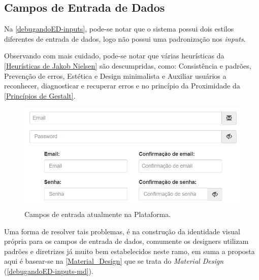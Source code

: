 \subsection{Campos de Entrada de Dados}
\label{Campos_de_Entrada_de_Dados}

Na \autoref{debugandoED-inputs}, pode-se notar que o sistema possui dois estilos diferentes de entrada de dados, logo não possui uma padronização nos \textit{inputs}.

Observando com mais cuidado, pode-se notar que várias heurísticas da \autoref{Heurísticas de Jakob Nielsen} são descumpridas, como: Consistência e padrões, Prevenção de erros, Estética e Design minimalista e Auxiliar usuários a reconhecer, diagnosticar e recuperar erros e no princípio da Proximidade da \autoref{Princípios de Gestalt}.


\begin{figure}[ht]
    \begin{center}
	    \includegraphics[scale=0.55]{figs/debugandoED-inputs.png}
	\end{center}
    \caption{\label{debugandoED-inputs}Campos de entrada atualmente na Plataforma.}
\end{figure}


Uma forma de resolver tais problemas, é na construção da identidade visual própria para os campos de entrada de dados, comumente os designers utilizam padrões e diretrizes já muito bem estabelecidos neste ramo, em suma a proposta aqui é basear-se na \autoref{Material_Design} que se trata do \textit{Material Design} (\autoref{debugandoED-inputs-md}).

